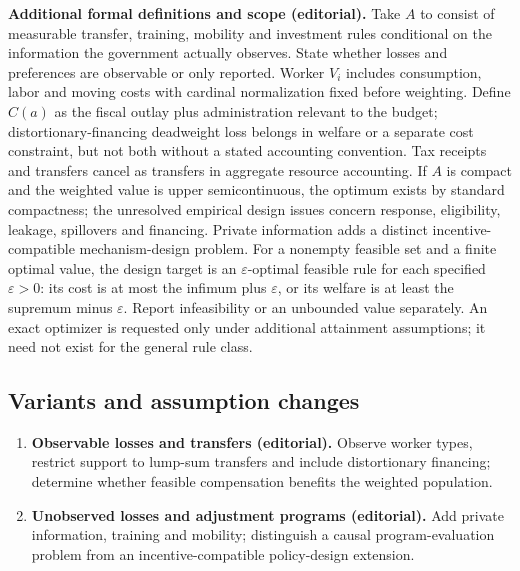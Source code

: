 \documentclass[11pt,a4paper]{article}
\begin{document}
\textbf{Additional formal definitions and scope (editorial).} Take \(A\) to consist of measurable transfer, training, mobility and investment rules conditional on the information the government actually observes. State whether losses and preferences are observable or only reported. Worker \(V_i\) includes consumption, labor and moving costs with cardinal normalization fixed before weighting. Define \(C(a)\) as the fiscal outlay plus administration relevant to the budget; distortionary-financing deadweight loss belongs in welfare or a separate cost constraint, but not both without a stated accounting convention. Tax receipts and transfers cancel as transfers in aggregate resource accounting. If \(A\) is compact and the weighted value is upper semicontinuous, the optimum exists by standard compactness; the unresolved empirical design issues concern response, eligibility, leakage, spillovers and financing. Private information adds a distinct incentive-compatible mechanism-design problem. For a nonempty feasible set and a finite optimal value, the design target is an \(\varepsilon\)-optimal feasible rule for each specified \(\varepsilon>0\): its cost is at most the infimum plus \(\varepsilon\), or its welfare is at least the supremum minus \(\varepsilon\). Report infeasibility or an unbounded value separately. An exact optimizer is requested only under additional attainment assumptions; it need not exist for the general rule class.
\subsection*{Variants and assumption changes}
\begin{enumerate}
\item \textbf{Observable losses and transfers (editorial).} Observe worker types, restrict support to lump-sum transfers and include distortionary financing; determine whether feasible compensation benefits the weighted population.
\item \textbf{Unobserved losses and adjustment programs (editorial).} Add private information, training and mobility; distinguish a causal program-evaluation problem from an incentive-compatible policy-design extension.
\end{enumerate}
\end{document}
